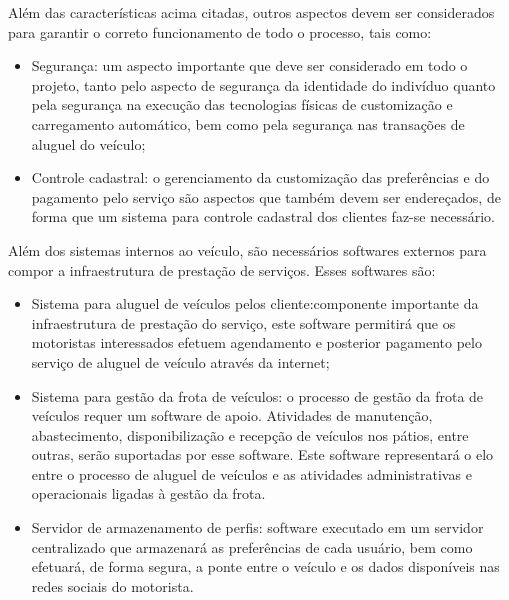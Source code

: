 \documentclass[12pt,journal,compsoc]{IEEEtran}
\begin{document}
Além das características acima citadas, outros aspectos devem ser considerados para garantir o correto funcionamento de todo o processo, tais como:

\begin{itemize}

\item Segurança: um aspecto importante que deve ser considerado em todo o projeto, tanto pelo aspecto de segurança da identidade do indivíduo quanto pela segurança na execução das tecnologias físicas de customização e carregamento automático, bem como pela segurança nas transações de aluguel do veículo;

\item Controle cadastral: o gerenciamento da customização das preferências e do pagamento pelo serviço são aspectos que também devem ser endereçados, de forma que um sistema para controle cadastral dos clientes faz-se necessário.

\end{itemize}

Além dos sistemas internos ao veículo, são necessários softwares externos para compor a infraestrutura de prestação de serviços. Esses softwares são:

\begin{itemize}

\item Sistema para aluguel de veículos pelos cliente:componente importante da infraestrutura de prestação do serviço, este software permitirá que os motoristas interessados efetuem agendamento e posterior pagamento pelo serviço de aluguel de veículo através da internet;

\item Sistema para gestão da frota de veículos: o processo de gestão da frota de veículos requer um software de apoio. Atividades de manutenção, abastecimento, disponibilização e recepção de veículos nos pátios, entre outras, serão suportadas por esse software. Este software representará o elo entre o processo de aluguel de veículos e as atividades administrativas e operacionais ligadas à gestão da frota.

\item Servidor de armazenamento de perfis: software executado em um servidor centralizado que armazenará as preferências de cada usuário, bem como efetuará, de forma segura, a ponte entre o veículo e os dados disponíveis nas redes sociais do motorista.

\end{itemize}
\end{document}
